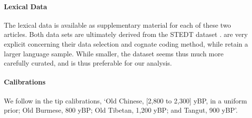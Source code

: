 \documentclass[a4paper,12pt]{scrartcl}
\begin{document}
\paragraph{Lexical Data}
The lexical data is available as supplementary material for each of these two
articles. Both data sets are ultimately derived from the STEDT dataset
\parencite{}.  are very explicit concerning their
data selection and cognate coding method, while
 retain a larger language sample. While
smaller, the \textcite{sagart2019dated} dataset seems thus much more carefully
curated, and is thus preferable for our analysis.

\paragraph{Calibrations}
We follow \textcite{sagart2019dated} in the tip calibrations, ‘Old Chinese, [2,800 to 2,300] yBP, in a uniform prior; Old Burmese, 800 yBP; Old Tibetan, 1,200 yBP; and Tangut, 900 yBP’.
\end{document}
